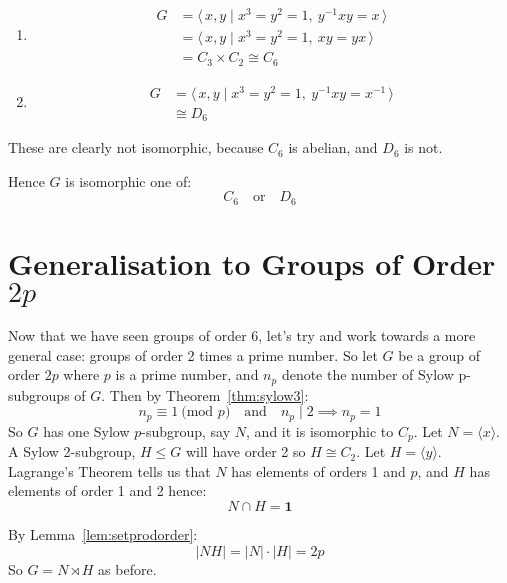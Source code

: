 \documentclass[a4paper, oneside, 12pt, final]{article}
\theoremstyle{definition}
\begin{document}
\begin{enumerate}
    \item
        \begin{equation*}
        \begin{aligned}
            G &= \langle\, x, y \mid x^3 = y^2 = 1,\ y^{-1}xy = x \,\rangle \\
            &=\langle\, x, y \mid x^3 = y^2 = 1,\ xy = yx \,\rangle \\
            &= C_3 \times C_2 \cong C_6
        \end{aligned}
        \end{equation*}

    \item
        \begin{equation*}
        \begin{aligned}
            G &= \langle\, x, y \mid x^3 = y^2 = 1,\ y^{-1}xy = x^{-1}
            \,\rangle \\
            &\cong D_6
        \end{aligned}
        \end{equation*}
\end{enumerate}

These are clearly not isomorphic, because \(C_6\) is abelian, and \(D_6\) is not.

Hence \(G\) is isomorphic one of:
\[C_6 \quad \text{or} \quad D_6\]

\section{Generalisation to Groups of Order \(2p\)}
Now that we have seen groups of order 6, let's try and work towards a more general case: groups of
order 2 times a prime number.
So let \(G\) be a group of order \(2p\) where \(p\) is a prime number, and \(n_p\) denote the number
of Sylow p-subgroups of \(G\).
Then by Theorem~\ref{thm:sylow3}:
\[n_p \equiv 1 \ \text{(mod \(p\))} \quad \text{and} \quad n_p \mid 2 \implies n_p = 1\]
So \(G\) has one Sylow \(p\)-subgroup, say \(N\), and it is isomorphic to \(C_p\).
Let \(N = \langle x \rangle\).
A Sylow 2-subgroup, \(H \leqslant G\) will have order 2 so \(H \cong C_2\).
Let \(H = \langle y \rangle\).
Lagrange's Theorem tells us that \(N\) has elements of orders 1 and \(p\), and \(H\) has elements of
order 1 and 2 hence:
\[N \cap H = \bm{1}\]

By Lemma~\ref{lem:setprodorder}:
\[|NH| = |N| \cdot |H| = 2p\]
So \(G = N \rtimes H\) as before.
\end{document}

